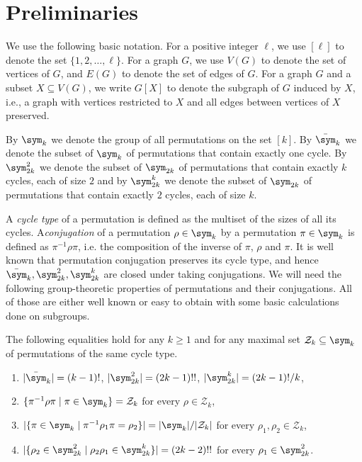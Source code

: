 \section{Preliminaries}\label{sec:prel}
We use the following basic notation. For a positive integer $\ell$, we use $[\ell]$ to denote the set $\{1, 2, \dots, \ell\}$. For a graph $G$, we use $V(G)$ to denote the set of vertices of $G$, and $E(G)$ to denote the set of edges of $G$. For a graph $G$ and a subset $X \subseteq V(G)$, we write $G[X]$ to denote the subgraph of $G$ induced by $X$, i.e., a graph with vertices restricted to $X$ and all edges between vertices of $X$ preserved.

By $\sym_k$ we denote the group of all permutations on the set $[k]$. By $\bar\sym_k$ we denote the subset of $\sym_k$ of permutations that contain exactly one cycle.
By $\sym_{2k}^2$ we denote the subset of $\sym_{2k}$ of permutations that contain exactly $k$ cycles, each of size $2$ and by $\sym_{2k}^k$ we denote the subset of $\sym_{2k}$ of permutations that contain exactly $2$ cycles, each of size $k$.

A \emph{cycle type} of a permutation is defined as the multiset of the sizes of all its cycles.
A\emph{conjugation} of a permutation $\rho \in \sym_k$ by a permutation $\pi \in \sym_k$ is defined as $\pi^{-1} \rho \pi$, i.e. the composition of the inverse of $\pi$, $\rho$ and $\pi$. It is well known that permutation conjugation preserves its cycle type, and hence $\bar\sym_k, \sym_{2k}^2, \sym_{2k}^k$ are closed under taking conjugations.
We will need the following group-theoretic properties of permutations and their conjugations. All of those are either well known or easy to obtain with some basic calculations done on subgroups.

\begin{prop}\label{prop:sym_k}
    The following equalities hold for any $k \geq 1$ and for any maximal set $\mathcal{Z}_k \subseteq \sym_k$ of permutations of the same cycle type.
    \begin{enumerate}
        \item $|\bar\sym_k| = (k - 1)!$, $|\sym_{2k}^2| = (2k - 1)!!$, $|\sym_{2k}^k| = (2k - 1)! / k$,
        \item $\{ \pi^{-1}\rho\pi \mid \pi \in \sym_k \} = \mathcal{Z}_k$ for every $\rho \in \mathcal{Z}_k$,
        \item $|\{ \pi \in \sym_k \mid \pi^{-1} \rho_1 \pi = \rho_2 \}| = |\sym_k| / |\mathcal{Z}_k|$ for every $\rho_1, \rho_2 \in \mathcal{Z}_k$,
        \item $|\{ \rho_2 \in \sym_{2k}^2 \mid \rho_2 \rho_1 \in \sym_{2k}^k \}| = (2k - 2)!!$ for every $\rho_1 \in \sym_{2k}^2$.
    \end{enumerate}
\end{prop}

